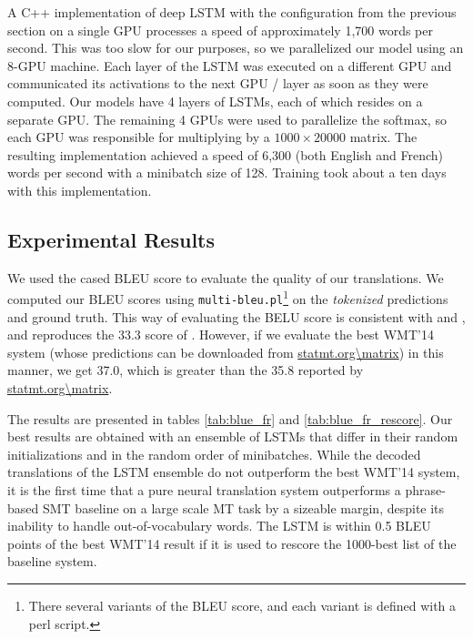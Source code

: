 \documentclass{article} \usepackage{nips14submit_e}
\begin{document}
A C++ implementation of deep LSTM with the configuration from the
previous section on a single GPU processes a speed of approximately
1,700 words per second.  This was too slow for our purposes, so we 
parallelized our model using an 8-GPU machine.  Each layer of the LSTM
was executed on a different GPU and communicated its activations
to the next GPU / layer as soon as they were computed.  Our models
have 4 layers of LSTMs, each of which resides on a separate GPU.  The remaining
4 GPUs were used to parallelize the softmax, so each GPU was
responsible for multiplying by a $1000\times 20000$ matrix.  The
resulting implementation achieved a speed of 6,300 (both English and
French) words per second with a minibatch size of 128. 
Training took about a ten days with this implementation.


\subsection{Experimental Results}

We used the cased BLEU score \cite{bleu} to evaluate the quality of our
translations. We computed our BLEU scores using \texttt{multi-bleu.pl}\footnote{
There several variants of the BLEU score, and each variant is defined  with a perl script. } 
on the \emph{tokenized} predictions and ground truth.
This way of evaluating the BELU score is consistent with \cite{cho14} and \cite{bog14}, and reproduces
the 33.3 score of \cite{wmt14_en_fr}.
However, if we evaluate the best WMT'14 system \cite{durrani-EtAl:2014:W14-33}
(whose predictions can be downloaded from \url{statmt.org\matrix}) in this manner, we get   
37.0, which is greater than the 35.8 reported by \url{statmt.org\matrix}.  







The results are presented in tables \ref{tab:blue_fr} and
\ref{tab:blue_fr_rescore}.  Our best results are obtained with an
ensemble of LSTMs that differ in their random initializations and
in the random order of minibatches.  While the decoded translations of the
LSTM ensemble do not outperform the best WMT'14 system, it is the first time
that a pure neural translation system outperforms a 
phrase-based SMT baseline on a large scale MT task by a sizeable margin,
despite its inability to handle out-of-vocabulary words.  The LSTM
is within 0.5 BLEU points of the best WMT'14 result if it is used to rescore the 1000-best
list of the baseline system.
\end{document}
